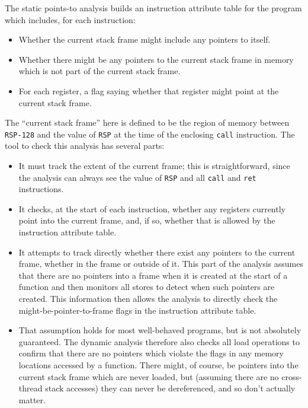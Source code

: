 
The static points-to analysis builds an instruction attribute table for the program which includes, for each instruction:

\begin{itemize}
\item
  Whether the current stack frame might include any pointers to itself.
\item
  Whether there might be any pointers to the current stack frame in memory which is not part of the current stack frame.
\item
  For each register, a flag saying whether that register might point at the current stack frame.
\end{itemize}

The ``current stack frame'' here is defined to be the region of memory between \verb|RSP-128| and the value of \verb|RSP| at the time of the enclosing \verb|call| instruction.
The tool to check this analysis has several parts:

\begin{itemize}
\item
  It must track the extent of the current frame; this is straightforward, since the analysis can always see the value of \verb|RSP| and all \verb|call| and \verb|ret| instructions.
\item
  It checks, at the start of each instruction, whether any registers currently point into the current frame, and, if so, whether that is allowed by the instruction attribute table.
\item
  It attempts to track directly whether there exist any pointers to the current frame, whether in the frame or outside of it.
  This part of the analysis assumes that there are no pointers into a frame when it is created at the start of a function and then monitors all stores to detect when such pointers are created.
  This information then allows the analysis to directly check the might-be-pointer-to-frame flags in the instruction attribute table.
\item
  That assumption holds for most well-behaved programs, but is not absolutely guaranteed.
  The dynamic analysis therefore also checks all load operations to confirm that there are no pointers which violate the flags in any memory locations accessed by a function.
  There might, of course, be pointers into the current stack frame which are never loaded, but (assuming there are no cross-thread stack accesses) they can never be dereferenced, and so don't actually matter.
\end{itemize}

